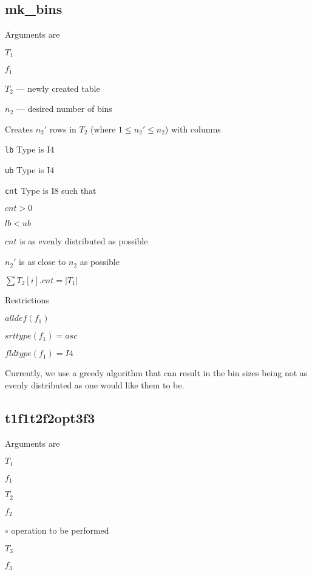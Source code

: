 \documentclass{report}
\begin{document}

\subsection{mk\_bins}
\label{mk_bins}

Arguments are
\be
\item \(T_1\)
\item \(f_1\)
\item \(T_2\) --- newly created table 
\item \(n_2\) --- desired number of bins
\ee

Creates \(n_2'\) rows in \(T_2\) (where \(1 \leq n_2' \leq n_2\)) with columns
\be
\item \verb+lb+  Type is I4
\item \verb+ub+  Type is I4
\item \verb+cnt+ Type is I8
\ee
such that 
\be
\item \(cnt > 0 \)
\item \(lb < ub \)
\item \(cnt\) is as evenly distributed as possible
\item \(n_2'\) is as close to \(n_2\) as possible
\item \(\sum T_2[i].cnt = |T_1|\)
\ee

Restrictions
\be
\item \(alldef(f_1)\) 
\item \(srttype(f_1) = asc\) 
\item \(fldtype(f_1) = I4\)
\item Currently, we use a greedy algorithm that can result in the bin
sizes being not as evenly distributed as one would like them to be.
\ee


\subsection{t1f1t2f2opt3f3}
\label{t1f1t2f2opt3f3}

Arguments are
\be
\item \(T_1\)
\item \(f_1\)
\item \(T_2\) 
\item \(f_2\)
\item \(\circ\) operation to be performed
\item \(T_3\) 
\item \(f_3\)
\ee
\end{document}
